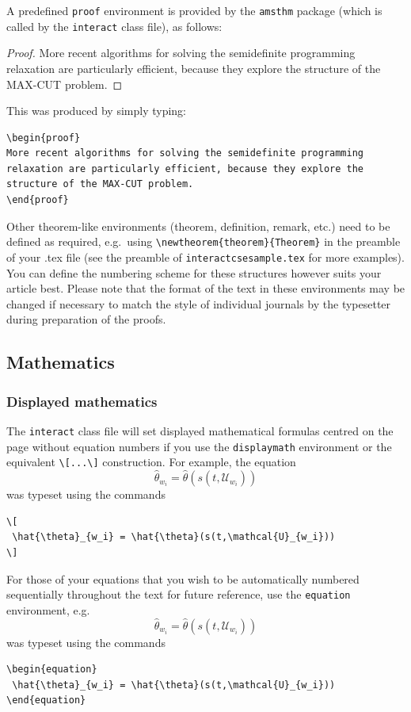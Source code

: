 \documentclass[]{interact}
\theoremstyle{plain}%
\theoremstyle{definition}
\theoremstyle{remark}
\begin{document}
A predefined \verb"proof" environment is provided by the \texttt{amsthm} package (which is called by the \texttt{interact} class file), as follows:
\begin{proof}
More recent algorithms for solving the semidefinite programming relaxation are particularly efficient, because they explore the structure of the MAX-CUT problem.
\end{proof}
\noindent This was produced by simply typing:
\begin{verbatim}
\begin{proof}
More recent algorithms for solving the semidefinite programming
relaxation are particularly efficient, because they explore the
structure of the MAX-CUT problem.
\end{proof}
\end{verbatim}
Other theorem-like environments (theorem, definition, remark, etc.) need to be defined as required, e.g.\ using \verb"\newtheorem{theorem}{Theorem}" in the preamble of your .tex file (see the preamble of \verb"interactcsesample.tex" for more examples). You can define the numbering scheme for these structures however suits your article best. Please note that the format of the text in these environments may be changed if necessary to match the style of individual journals by the typesetter during preparation of the proofs.


\subsection{Mathematics}

\subsubsection{Displayed mathematics}

The \texttt{interact} class file will set displayed mathematical formulas centred on the page without equation numbers if you use the \texttt{displaymath} environment or the equivalent \verb"\[...\]" construction. For example, the equation
\[
 \hat{\theta}_{w_i} = \hat{\theta}(s(t,\mathcal{U}_{w_i}))
\]
was typeset using the commands
\begin{verbatim}
\[
 \hat{\theta}_{w_i} = \hat{\theta}(s(t,\mathcal{U}_{w_i}))
\]
\end{verbatim}

For those of your equations that you wish to be automatically numbered sequentially throughout the text for future reference, use the \texttt{equation} environment, e.g.
\begin{equation}
 \hat{\theta}_{w_i} = \hat{\theta}(s(t,\mathcal{U}_{w_i}))
\end{equation}
was typeset using the commands
\begin{verbatim}
\begin{equation}
 \hat{\theta}_{w_i} = \hat{\theta}(s(t,\mathcal{U}_{w_i}))
\end{equation}
\end{verbatim}
\end{document}
